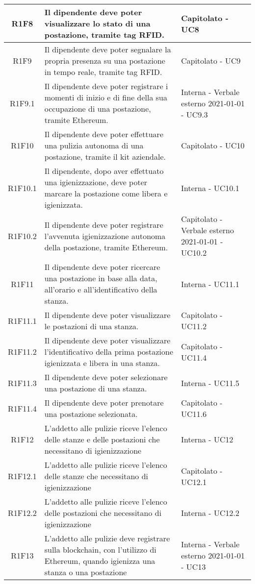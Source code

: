 \begin{center}
\begin{longtable}{|c|p{10cm}|p{4cm}|}
\hline
					R1F8&Il dipendente deve poter visualizzare lo stato di una postazione, tramite tag RFID.	&Capitolato - UC8 	\\
					\hline
			R1F9&Il dipendente deve poter segnalare la propria presenza su una postazione in tempo reale, tramite tag RFID.	&Capitolato - UC9 	\\
		\hline
		R1F9.1&Il dipendente deve poter registrare i momenti di inizio e di fine della sua occupazione di una postazione, tramite Ethereum.	&Interna - Verbale esterno 2021-01-01 - UC9.3 	\\
		\hline	
		R1F10&Il dipendente deve poter effettuare una pulizia autonoma di una postazione, tramite il kit aziendale.	&Capitolato - UC10	\\
		\hline		
		R1F10.1&Il dipendente, dopo aver effettuato una igienizzazione, deve poter marcare la postazione come libera e igienizzata.	&Interna - UC10.1	\\
		\hline	
		R1F10.2&Il dipendente deve poter registrare l'avvenuta igienizzazione autonoma della postazione, tramite Ethereum.	&Capitolato - Verbale esterno 2021-01-01 - UC10.2	\\
		\hline	
		R1F11&Il dipendente deve poter ricercare una postazione in base alla data, all'orario e all'identificativo della stanza.	&Interna - UC11.1	\\
		\hline
		R1F11.1&Il dipendente deve poter visualizzare le postazioni di una stanza.	&Capitolato - UC11.2	\\
		\hline
		R1F11.2&Il dipendente deve poter visualizzare l'identificativo della prima postazione igienizzata e libera in una stanza.	&Capitolato - UC11.4	\\
		\hline
		R1F11.3&Il dipendente deve poter selezionare una postazione di una stanza.	&Interna - UC11.5	\\
		\hline
		R1F11.4&Il dipendente deve poter prenotare una postazione selezionata.	&Capitolato - UC11.6	\\
		\hline
R1F12&L'addetto alle pulizie riceve l'elenco delle stanze e delle postazioni che necessitano di igienizzazione	& Interna - UC12	\\
						\hline
			R1F12.1&	L'addetto alle pulizie riceve l'elenco delle stanze che necessitano di igienizzazione& 	Capitolato - UC12.1\\
					\hline
			R1F12.2&L'addetto alle pulizie riceve l'elenco delle postazioni che necessitano di igienizzazione	& Interna - UC12.2	\\
					\hline
R1F13&L'addetto alle pulizie deve registrare sulla blockchain, con l'utilizzo di Ethereum, quando igienizza una stanza o una postazione	& Interna - Verbale esterno 2021-01-01 - UC13	\\

\end{longtable}
\end{center}
